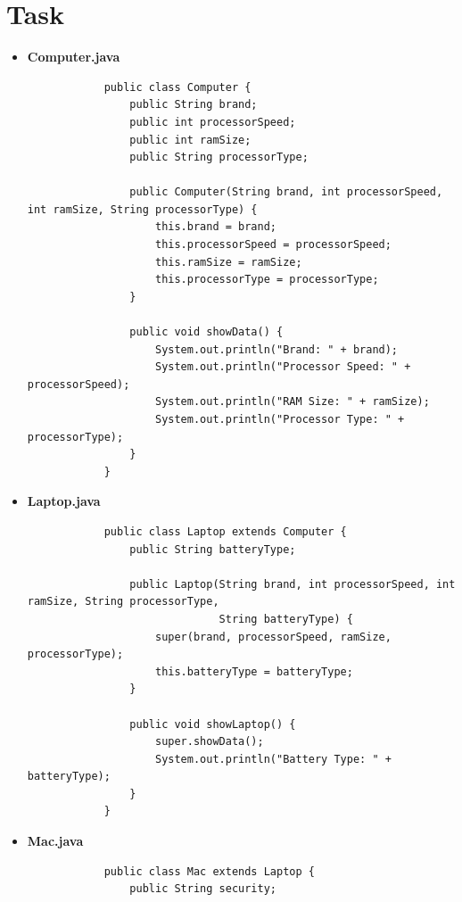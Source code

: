 \documentclass[12pt,titlepage]{article}
\begin{document}
\section{Task}
\begin{itemize}
    \item {
        \textbf{Computer.java}
        \begin{verbatim}
            public class Computer {
                public String brand;
                public int processorSpeed;
                public int ramSize;
                public String processorType;

                public Computer(String brand, int processorSpeed, int ramSize, String processorType) {
                    this.brand = brand;
                    this.processorSpeed = processorSpeed;
                    this.ramSize = ramSize;
                    this.processorType = processorType;
                }

                public void showData() {
                    System.out.println("Brand: " + brand);
                    System.out.println("Processor Speed: " + processorSpeed);
                    System.out.println("RAM Size: " + ramSize);
                    System.out.println("Processor Type: " + processorType);
                }
            }
        \end{verbatim}
    }
    \item {
        \textbf{Laptop.java}
        \begin{verbatim}
            public class Laptop extends Computer {
                public String batteryType;

                public Laptop(String brand, int processorSpeed, int ramSize, String processorType, 
                              String batteryType) {
                    super(brand, processorSpeed, ramSize, processorType);
                    this.batteryType = batteryType;
                }

                public void showLaptop() {
                    super.showData();
                    System.out.println("Battery Type: " + batteryType);
                }
            }
        \end{verbatim}
    }
    \item {
        \textbf{Mac.java}
        \begin{verbatim}
            public class Mac extends Laptop {
                public String security;


\end{verbatim}}
\end{itemize}
\end{document}
